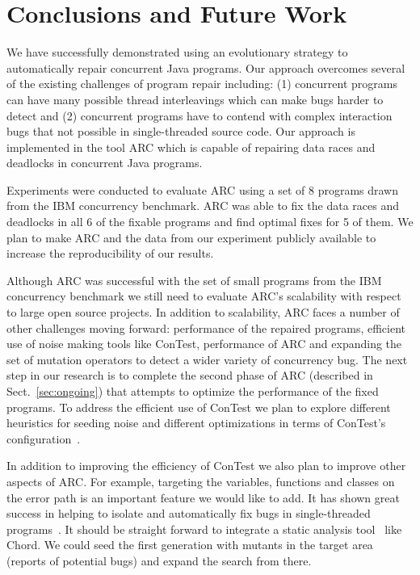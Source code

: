 \section{Conclusions and Future Work}
\label{sec:conclusion}


We have successfully demonstrated using an evolutionary strategy to automatically repair concurrent Java programs. Our approach overcomes several of the existing challenges of program repair including: (1) concurrent programs can have many possible thread interleavings which can make bugs harder to detect and (2) concurrent programs have to contend with complex interaction bugs that not possible in single-threaded source code. Our approach is implemented in the tool ARC which is capable of repairing data races and deadlocks in concurrent Java programs.

 Experiments were conducted to evaluate ARC using a set of 8 programs drawn from the IBM concurrency benchmark. ARC was able to fix the data races and deadlocks in all 6 of the fixable programs and find optimal fixes
for 5 of them. We plan to make ARC and the data from our experiment publicly available to increase the reproducibility of our results.

Although ARC was successful with the set of small programs from the IBM concurrency benchmark we still need to evaluate ARC's scalability with respect to large open source projects. In addition to scalability, ARC faces a number of other challenges moving forward:  performance of the repaired programs, efficient use of noise making tools like ConTest, performance of ARC and expanding the set of mutation operators to detect a wider variety of concurrency bug. The next step in our research is to complete the second phase of ARC (described in Sect.~\ref{sec:ongoing}) that attempts to
optimize the performance of the fixed programs. To address the efficient use of ConTest we plan to explore different heuristics for seeding noise and different optimizations in terms of ConTest's configuration~\cite{KLVU10}.

In addition to improving the efficiency of ConTest we also plan to improve other aspects of ARC. For example, targeting the variables, functions and classes on the error path is an important feature  we would like to add. It has shown great success in helping to isolate and automatically fix bugs in single-threaded programs~\cite{FNWG09, WNLF09, NWLF09, WFGN10, GNFW11, LDFW12}. It should be straight forward to integrate a static analysis tool~\cite{HP04, NPSG09, NWLF09} like Chord.  We could seed the first generation with mutants in the target area (reports of potential bugs) and expand the search from there.

